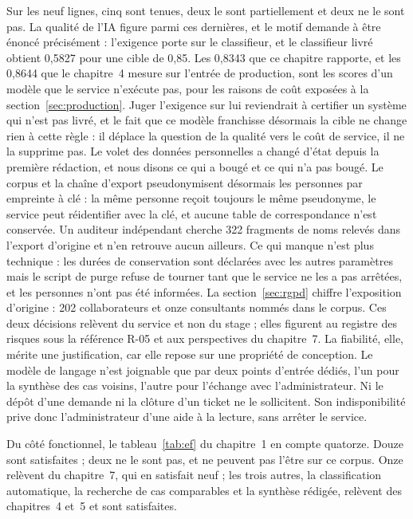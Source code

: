 Sur les neuf lignes, cinq sont tenues, deux le sont partiellement et deux ne le sont pas. La qualité
de l'IA figure parmi ces dernières, et le motif demande à être énoncé précisément : l'exigence
porte sur le classifieur, et le classifieur livré obtient 0,5827 pour une cible de 0,85. Les 0,8343
que ce chapitre rapporte, et les 0,8644 que le chapitre~4 mesure sur l'entrée de production, sont
les scores d'un modèle que le service n'exécute pas, pour les raisons de coût exposées à la
section~\ref{sec:production}. Juger l'exigence sur lui reviendrait à certifier un système qui n'est
pas livré, et le fait que ce modèle franchisse désormais la cible ne change rien à cette règle : il
déplace la question de la qualité vers le coût de service, il ne la supprime pas. Le volet
des données personnelles a changé d'état depuis la première rédaction, et nous disons ce qui a
bougé et ce qui n'a pas bougé. Le corpus et la chaîne d'export pseudonymisent désormais les
personnes par empreinte à clé : la même personne reçoit toujours le même pseudonyme, le service
peut réidentifier avec la clé, et aucune table de correspondance n'est conservée. Un auditeur
indépendant cherche 322 fragments de noms relevés dans l'export d'origine et n'en retrouve aucun
ailleurs. Ce qui manque n'est plus technique : les durées de conservation sont déclarées avec les
autres paramètres mais le script de purge refuse de tourner tant que le service ne les a pas
arrêtées, et les personnes n'ont pas été informées. La section~\ref{sec:rgpd} chiffre l'exposition
d'origine : 202 collaborateurs et onze consultants nommés dans le corpus. Ces deux décisions
relèvent du service et non du stage ; elles figurent au registre des risques sous la référence R-05
et aux perspectives du chapitre~7. La fiabilité, elle,
mérite une justification, car elle repose sur une propriété de conception. Le modèle de langage
n'est joignable que par deux points d'entrée dédiés, l'un pour la synthèse des cas voisins, l'autre
pour l'échange avec l'administrateur. Ni le dépôt d'une demande ni la clôture d'un ticket ne le
sollicitent. Son indisponibilité prive donc l'administrateur d'une aide à la lecture, sans arrêter
le service.

Du côté fonctionnel, le tableau~\ref{tab:ef} du chapitre~1 en compte quatorze. Douze sont
satisfaites ; deux ne le sont pas, et ne peuvent pas l'être sur ce corpus. Onze relèvent du
chapitre~7, qui en satisfait neuf ; les trois autres, la classification automatique, la recherche
de cas comparables et la synthèse rédigée, relèvent des chapitres~4 et~5 et sont satisfaites.

